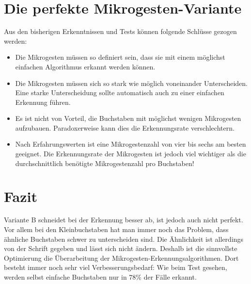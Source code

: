 \section{Die perfekte Mikrogesten-Variante}
Aus den bisherigen Erkenntnissen und Tests können folgende Schlüsse gezogen werden:

\begin{itemize}
 \item Die Mikrogesten müssen so definiert sein, dass sie mit einem möglichst einfachen Algorithmus erkannt werden können.
 \item Die Mikrogesten müssen sich so stark wie möglich voneinander Unterscheiden. Eine starke Unterscheidung sollte automatisch auch zu einer einfachen Erkennung führen.
 \item Es ist nicht von Vorteil, die Buchstaben mit möglichst wenigen Mikrogesten aufzubauen. Paradoxerweise kann dies die Erkennungsrate verschlechtern.
\item Nach Erfahrungswerten ist eine Mikrogestenzahl von vier bis sechs am besten geeignet. Die Erkennungsrate der Mikrogesten ist jedoch viel wichtiger als die durchschnittlich benötigte Mikrogestenzahl pro Buchstaben!
\end{itemize}

\section{Fazit}
Variante B schneidet bei der Erkennung besser ab, ist jedoch auch nicht perfekt. Vor allem bei den Kleinbuchstaben hat man immer noch das Problem, dass ähnliche Buchstaben schwer zu unterscheiden sind. Die Ähnlichkeit ist allerdings von der Schrift gegeben und lässt sich nicht ändern. Deshalb ist die sinnvollste Optimierung die Überarbeitung der Mikrogesten-Erkennungsalgorithmen. Dort besteht immer noch sehr viel Verbesserungsbedarf: Wie beim Test gesehen, werden selbst einfache Buchstaben nur in 78\% der Fälle erkannt.